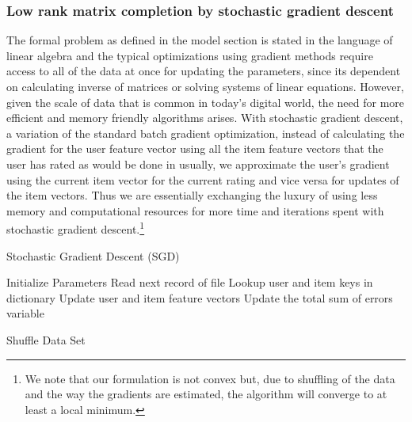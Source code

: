 \documentclass[12pt]{article}
\begin{document}
\subsubsection*{Low rank matrix completion by stochastic gradient descent}
The formal problem as defined in the model section is stated in the language of linear algebra and the typical optimizations using gradient methods require access to all of the data at once for updating the parameters, since its dependent on calculating inverse of matrices or solving systems of linear equations. However, given the scale of data that is common in today's digital world, the need for more efficient and memory friendly algorithms arises. With stochastic gradient descent, a variation of the standard batch gradient optimization, instead of calculating the gradient for the user feature vector using all the item feature vectors that the user has rated as would be done in usually, we approximate the user's gradient using the current item vector for the current rating and vice versa for updates of the item vectors. Thus we are essentially exchanging the luxury of using less memory and computational resources for more time and iterations spent with stochastic gradient descent.\footnote{We note that our formulation is not convex but, due to shuffling of the data and the way the gradients are estimated, the algorithm will converge to at least a local minimum.}


\begin{algorithm}[H]
\caption{Stochastic Gradient Descent (SGD)}
\begin{algorithmic}
\Require
\State Initialize Parameters
\Repeat
	\State Read next record of file
	\State Lookup user and item keys in dictionary
	\State Update user and item feature vectors
	\State Update the total sum of errors variable
	
\State Shuffle Data Set
\Ensure
\end{algorithmic}
\end{algorithm}
\end{document}
